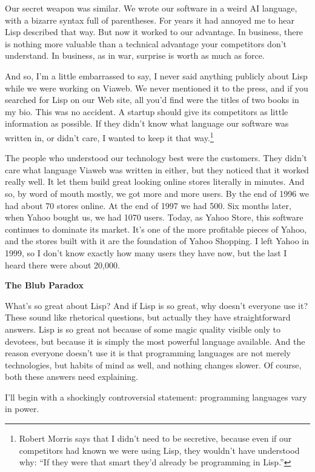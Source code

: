 \documentclass[12pt]{book}
\begin{document}
Our secret weapon was similar. We wrote our software in a weird AI
language, with a bizarre syntax full of parentheses. For years it had
annoyed me to hear Lisp described that way. But now it worked to our
advantage. In business, there is nothing more valuable than a technical
advantage your competitors don't understand. In business, as in war,
surprise is worth as much as force.

And so, I'm a little embarrassed to say, I never said anything publicly
about Lisp while we were working on Viaweb. We never mentioned it to the
press, and if you searched for Lisp on our Web site, all you'd find were
the titles of two books in my bio. This was no accident. A startup
should give its competitors as little information as possible. If they
didn't know what language our software was written in, or didn't care, I
wanted to keep it that way.\footnote{Robert Morris says that I didn't need to be secretive, because
even if our competitors had known we were using Lisp, they wouldn't have
understood why: ``If they were that smart they'd already be programming
in Lisp.''}

The people who understood our technology best were the customers. They
didn't care what language Viaweb was written in either, but they noticed
that it worked really well. It let them build great looking online
stores literally in minutes. And so, by word of mouth mostly, we got
more and more users. By the end of 1996 we had about 70 stores online.
At the end of 1997 we had 500. Six months later, when Yahoo bought us,
we had 1070 users. Today, as Yahoo Store, this software continues to
dominate its market. It's one of the more profitable pieces of Yahoo,
and the stores built with it are the foundation of Yahoo Shopping. I
left Yahoo in 1999, so I don't know exactly how many users they have
now, but the last I heard there were about 20,000.

\textbf{The Blub Paradox}

What's so great about Lisp? And if Lisp is so great, why doesn't
everyone use it? These sound like rhetorical questions, but actually
they have straightforward answers. Lisp is so great not because of some
magic quality visible only to devotees, but because it is simply the
most powerful language available. And the reason everyone doesn't use it
is that programming languages are not merely technologies, but habits of
mind as well, and nothing changes slower. Of course, both these answers
need explaining.

I'll begin with a shockingly controversial statement: programming
languages vary in power.
\end{document}
